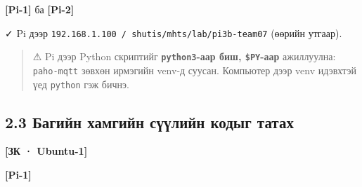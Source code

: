 \textbf{{[}Pi-1{]}} ба \textbf{{[}Pi-2{]}}

\begin{Shaded}
\begin{Highlighting}[]
  \KeywordTok{\&\&} \KeywordTok{\&\&}  
 \StringTok{ / }\StringTok{/}\StringTok{/}\StringTok{/}
\end{Highlighting}
\end{Shaded}

✓ Pi дээр \texttt{192.\allowbreak{}168.\allowbreak{}1.\allowbreak{}100\ /\allowbreak{}\ shutis/\allowbreak{}mhts/\allowbreak{}lab/\allowbreak{}pi3b-team07} (өөрийн утгаар).

\begin{quote}
⚠ Pi дээр Python скриптийг \textbf{\texttt{python3}-аар биш, \texttt{\$PY}-аар} ажиллуулна: \texttt{paho-mqtt} зөвхөн ирмэгийн venv-д суусан. Компьютер дээр venv идэвхтэй үед \texttt{python} гэж бичнэ.
\end{quote}

\hypertarget{ux431ux430ux433ux438ux439ux43d-ux445ux430ux43cux433ux438ux439ux43d-ux441ux4afux4afux43bux438ux439ux43d-ux43aux43eux434ux44bux433-ux442ux430ux442ux430ux445}{%
\subsection{2.3 Багийн хамгийн сүүлийн кодыг татах}\label{ux431ux430ux433ux438ux439ux43d-ux445ux430ux43cux433ux438ux439ux43d-ux441ux4afux4afux43bux438ux439ux43d-ux43aux43eux434ux44bux433-ux442ux430ux442ux430ux445}}

\textbf{{[}ЗК · Ubuntu-1{]}}

\begin{Shaded}
\begin{Highlighting}[]
\KeywordTok{\&\&} 
\end{Highlighting}
\end{Shaded}

\textbf{{[}Pi-1{]}}

\begin{Shaded}
\begin{Highlighting}[]
\end{Highlighting}
\end{Shaded}

